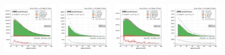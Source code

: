 \begin{figure}
    \centering
    \includegraphics[width=0.24\textwidth]{appendices/qcdSF/figures/4j1b/mu_leptonOnePt_True_mcqcd.png}
    \includegraphics[width=0.24\textwidth]{appendices/qcdSF/figures/4j1b/mu_leptonOnePt_False.png}
    \includegraphics[width=0.24\textwidth]{appendices/qcdSF/figures/4j1b/e_leptonOnePt_True_mcqcd.png}
    \includegraphics[width=0.24\textwidth]{appendices/qcdSF/figures/4j1b/e_leptonOnePt_False.png}
    

\end{figure}
